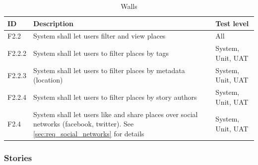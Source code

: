 \documentclass[11pt]{book}
\begin{document}
\begin{table}[H]
\centering
\begin{tabular}{ l  p{11cm} l }
    ID       & Description                                                                                              & Test level            \\ \hline
    F2.2     & System shall let users filter and view places                                                            & All                   \\ \hline
    F2.2.2   & System shall let users to filter places by tags                                                          & System, Unit, UAT     \\ \hline
    F2.2.3   & System shall let users to filter places by metadata (location)                                           & System, Unit, UAT     \\ \hline
    F2.2.4   & System shall let users to filter places by story authors                                                 & System, Unit, UAT     \\ \hline
    F2.4     & System shall let users like and share places over social networks (facebook, twitter). 
               See \ref{sec:req_social_networks} for details                                                            & System, Unit, UAT     \\ 
\end{tabular}
\label{tab:req_walls}
\caption{Walls}
\end{table}

\subsubsection{Stories}
\end{document}
